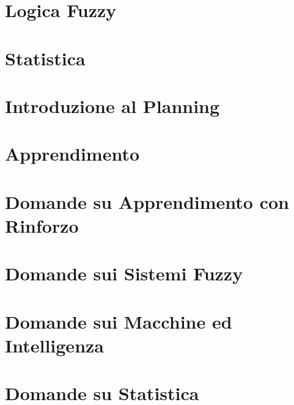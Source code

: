 \providecommand{\main}{.}








{\hypersetup{hidelinks}
  \tableofcontents  %
}

\chapter{Logica Fuzzy}


\chapter{Statistica}


\chapter{Introduzione al Planning}


\chapter{Apprendimento}


\appendix
\chapter{Domande su Apprendimento con Rinforzo}


\chapter{Domande sui Sistemi Fuzzy}


\chapter{Domande sui Macchine ed Intelligenza}


\chapter{Domande su Statistica}


